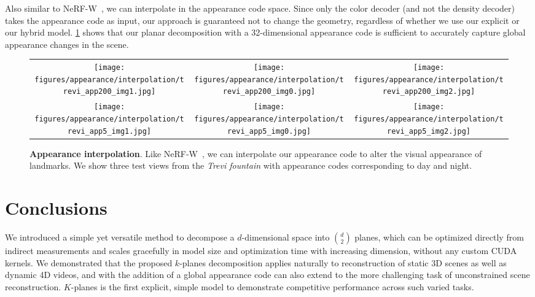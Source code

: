 \documentclass[10pt,twocolumn,letterpaper]{article}
\newcommand{\modelname}{$k$-planes}
\newcommand{\Modelname}{$K$-planes}
\begin{document}
Also similar to NeRF-W~\cite{martinbrualla2020nerfw, Piotr2017latentspaceoptim}, we can interpolate in the appearance code space. Since only the color decoder (and not the density decoder) takes the appearance code as input, our approach is guaranteed not to change the geometry, regardless of whether we use our explicit or our hybrid model. \cref{fig:interpolation} shows that our planar decomposition with a 32-dimensional appearance code is sufficient to accurately capture global appearance changes in the scene.


\newcommand{\figinterpheight}{2.475cm}
\begin{figure}
    \centering
    \begin{tabular}{c@{\hskip 1mm}c@{}@{\hskip 1mm}c@{}}
    \texttt{[image: figures/appearance/interpolation/trevi\_app200\_img1.jpg]} &
    \texttt{[image: figures/appearance/interpolation/trevi\_app200\_img0.jpg]} &
    \texttt{[image: figures/appearance/interpolation/trevi\_app200\_img2.jpg]} \\
    \texttt{[image: figures/appearance/interpolation/trevi\_app5\_img1.jpg]} &
    \texttt{[image: figures/appearance/interpolation/trevi\_app5\_img0.jpg]} &
    \texttt{[image: figures/appearance/interpolation/trevi\_app5\_img2.jpg]}
    \end{tabular} 
    \caption{\textbf{Appearance interpolation}. Like NeRF-W~\cite{martinbrualla2020nerfw}, we can interpolate our appearance code to alter the visual appearance of landmarks. We show three test views from the \emph{Trevi fountain} with appearance codes corresponding to day and night.}
    \label{fig:interpolation}
\end{figure}
 
\section{Conclusions}

We introduced a simple yet versatile method to decompose a $d$-dimensional space into $\binom{d}{2}$ planes, which can be optimized directly from indirect measurements and scales gracefully in model size and optimization time with increasing dimension, without any custom CUDA kernels. 
We demonstrated that the proposed \modelname{} decomposition applies naturally to reconstruction of static 3D scenes as well as dynamic 4D videos, and with the addition of a global appearance code can also extend to the more challenging task of unconstrained scene reconstruction. \Modelname{} is the first explicit, simple model to demonstrate competitive performance across such varied tasks.
\end{document}
